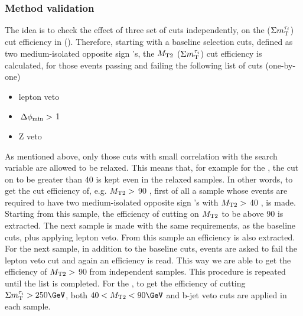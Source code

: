 \subsubsection{Method validation}
The idea is to check the effect of three set of cuts independently, 
on the \mttwo ($\Sigma m_{\rm T}^{\tau_i}$) cut efficiency in  \binone (\bintwo). 
Therefore, starting with a baseline selection cuts, defined as two 
medium-isolated opposite sign \Tau's, the ${M_{\rm T2}}$ ($\Sigma m_{\rm T}^{\tau_i}$) cut 
efficiency is calculated, for those events passing and failing the following list of cuts (one-by-one)
\begin{itemize}
\item lepton veto
\item $\,{\Delta\phi_{\rm min}}>$ 1
\item Z veto 
\end{itemize}
As mentioned above, only those cuts with small correlation with the search variable are allowed to be relaxed. This 
means that, for example for the \binone, the cut on \mttwo to be greater than 40 \GeV is kept even in the relaxed samples. 
In other words, to get the cut efficiency of, e.g. ${M_{\rm T2}}>$ 90 \GeV, first of all a sample whose events are required 
to have two medium-isolated opposite sign \Tau's with ${M_{\rm T2}}>$ 40 \GeV, is made. Starting from this sample, the efficiency of 
cutting on ${M_{\rm T2}}$ to be above 90 \GeV is extracted. The next sample is made with the same requirements, as the baseline cuts, 
plus applying lepton veto. From this sample an efficiency is also extracted. For the next sample, in addition to the baseline 
cuts, events are asked to fail the lepton veto cut and again an efficiency is read. This way we are able to get the efficiency 
of ${M_{\rm T2}}>$ 90 \GeV from independent samples. This procedure is repeated until the list is completed. For the \bintwo, 
 to get the efficiency of cutting $\SumMT>250\GeV$, both $40 < \mttwo < 90 \GeV$ and b-jet veto cuts are applied in each sample.
            

